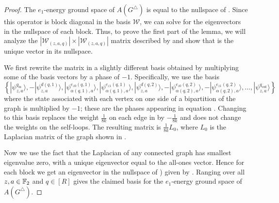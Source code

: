 \documentclass[../thesis-main/thesis-main]{subfiles}
\begin{document}
\begin{proof}
The $e_1$-energy ground space of $A(G^{\triangle})$ is equal to the nullspace of . Since this operator is block diagonal in the basis $\mathcal{W}$, we can solve for the eigenvectors in the nullspace of each block. Thus, to prove the first part of the lemma, we will analyze the $|\mathcal{W}_{(z,a,q)}|\times|\mathcal{W}_{(z,a,q)}|$ matrix described by  and show that  is the unique vector in its nullspace. 

We first rewrite the matrix in a slightly different basis obtained by multiplying some of the basis vectors by a phase of $-1$. Specifically, we use the basis
\begin{equation}
\left\{
   |\psi_{z,a}^{q_{\mathrm{in}}}\rangle,
  -|\psi_{z,a}^{d(q,1)}\rangle,
   |\psi_{\alpha(q,1),a}^{e_{z0}(q,1)}\rangle,
   |\psi_{\alpha(q,1),a}^{e_{z1}(q,1)}\rangle,
   |\psi_{z,a}^{d(q,2)}\rangle,
  -|\psi_{\alpha(q,2),a}^{e_{z0}(q,2)}\rangle,
  -|\psi_{\alpha(q,2),a}^{e_{z1}(q,2)}\rangle,
   \ldots,
   |\psi_{z,a}^{q_{\mathrm{out}}}\rangle
\right\} 
\end{equation}
where the state associated with each vertex on one side of a bipartition of the graph is multiplied by $-1$; these are the phases appearing in equation . Changing to this basis replaces the weight $\frac{1}{8k}$ on each edge in  by $-\frac{1}{8k}$ and does not change the weights on the self-loops. The resulting matrix is $\frac{1}{8k}L_{0}$, where $L_{0}$ is the Laplacian matrix of the graph shown in . 

Now we use the fact that the Laplacian of any connected graph has smallest eigenvalue zero, with a unique eigenvector equal to the all-ones vector. Hence for each block we get an eigenvector in the nullspace of ) given by . Ranging over all $z,a\in\mathbb{F}_2$ and $q\in[R]$ gives the claimed basis for the $e_1$-energy ground space of $A(G^{\triangle})$.


\end{proof}
\end{document}
